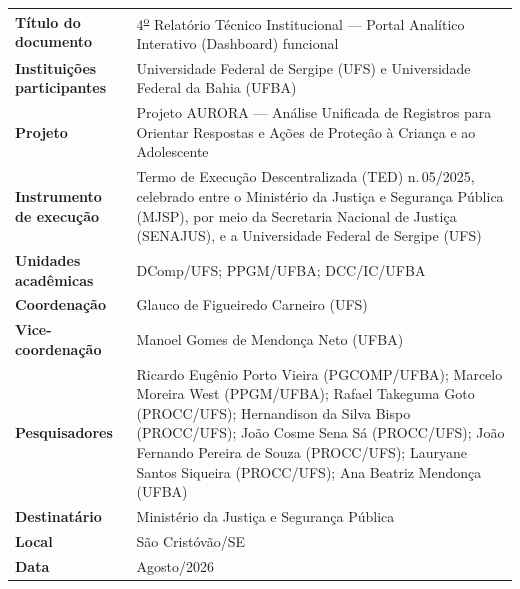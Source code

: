 \documentclass[11pt,a4paper]{article}
\begin{document}
\begin{tabular}{@{}P{4.8cm}P{10cm}@{}}
  \sffamily\small\bfseries Título do documento
    & \small 4\textsuperscript{\underline{o}} Relatório Técnico Institucional — Portal Analítico Interativo (Dashboard) funcional \\[8pt]

  \sffamily\small\bfseries Instituições participantes
    & \small Universidade Federal de Sergipe (UFS) e
      Universidade Federal da Bahia (UFBA) \\[4pt]

  \sffamily\small\bfseries Projeto
    & \small Projeto AURORA — Análise Unificada de Registros para
      Orientar Respostas e Ações de Proteção à Criança e ao
      Adolescente \\[4pt]

  \sffamily\small\bfseries Instrumento de execução
    & \small Termo de Execução Descentralizada (TED) n.\,05/2025,
      celebrado entre o Ministério da Justiça e Segurança Pública
      (MJSP), por meio da Secretaria Nacional de Justiça (SENAJUS),
      e a Universidade Federal de Sergipe (UFS) \\[4pt]

  \sffamily\small\bfseries Unidades acadêmicas
    & \small DComp/UFS; PPGM/UFBA; DCC/IC/UFBA \\[4pt]

  \sffamily\small\bfseries Coordenação
    & \small Glauco de Figueiredo Carneiro (UFS) \\[4pt]

  \sffamily\small\bfseries Vice-coordenação
    & \small Manoel Gomes de Mendonça Neto (UFBA) \\[4pt]

  \sffamily\small\bfseries Pesquisadores
    & \small Ricardo Eugênio Porto Vieira (PGCOMP/UFBA);
      Marcelo Moreira West (PPGM/UFBA);
      Rafael Takeguma Goto (PROCC/UFS);
      Hernandison da Silva Bispo (PROCC/UFS);
      João Cosme Sena Sá (PROCC/UFS);
      João Fernando Pereira de Souza (PROCC/UFS);
      Lauryane Santos Siqueira (PROCC/UFS);
      Ana Beatriz Mendonça (UFBA) \\[4pt]
  \sffamily\small\bfseries Destinatário
    & \small Ministério da Justiça e Segurança Pública \\[4pt]

  \sffamily\small\bfseries Local
    & \small São Cristóvão/SE \\[4pt]

  \sffamily\small\bfseries Data
    & \small Agosto/2026 \\[4pt]
\end{tabular}
\end{document}
